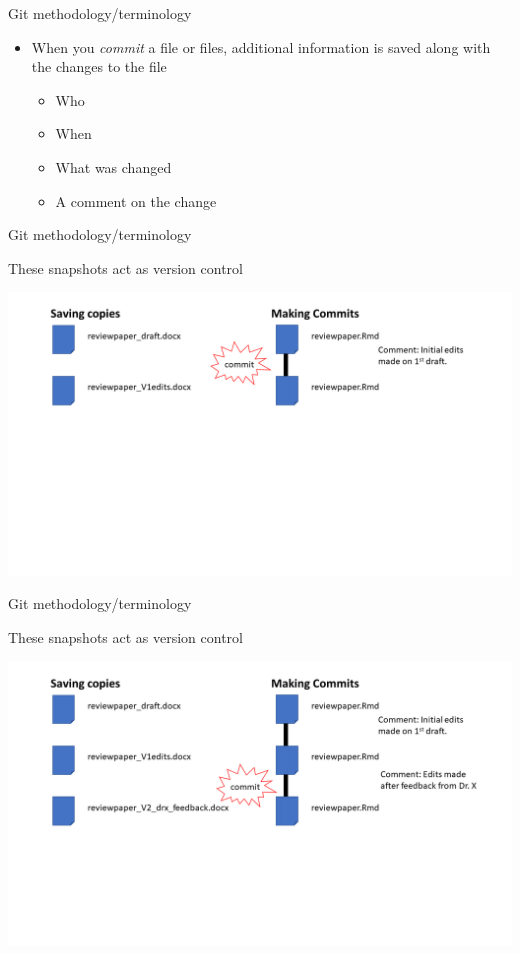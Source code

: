 \documentclass[
  ignorenonframetext,
]{beamer}
\providecommand{\tightlist}{%
  \setlength{\itemsep}{0pt}\setlength{\parskip}{0pt}}
\begin{document}
\begin{frame}{Git methodology/terminology}
\protect\hypertarget{git-methodologyterminology}{}

\begin{itemize}
\tightlist
\item
  When you \emph{commit} a file or files, additional information is
  saved along with the changes to the file

  \begin{itemize}
  \tightlist
  \item
    Who
  \item
    When
  \item
    What was changed
  \item
    A comment on the change
  \end{itemize}
\end{itemize}

\end{frame}

\begin{frame}{Git methodology/terminology}
\protect\hypertarget{git-methodologyterminology-1}{}

These snapshots act as version control

\includegraphics{pres_figs/copies_commits1.png}

\end{frame}

\begin{frame}{Git methodology/terminology}
\protect\hypertarget{git-methodologyterminology-2}{}

These snapshots act as version control

\includegraphics{pres_figs/copies_commits2.png}

\end{frame}
\end{document}
